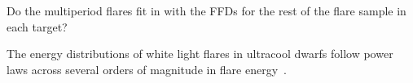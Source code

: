 \documentclass[fleqn,usenatbib,letters]{mnras}%
\begin{document}
Do the multiperiod flares fit in with the FFDs for the rest of the flare sample in each target?

The energy distributions of white light flares in ultracool dwarfs follow power laws across several orders of magnitude in flare energy~\citep{gizis2017b, paudel2018}.
%
\end{document}
